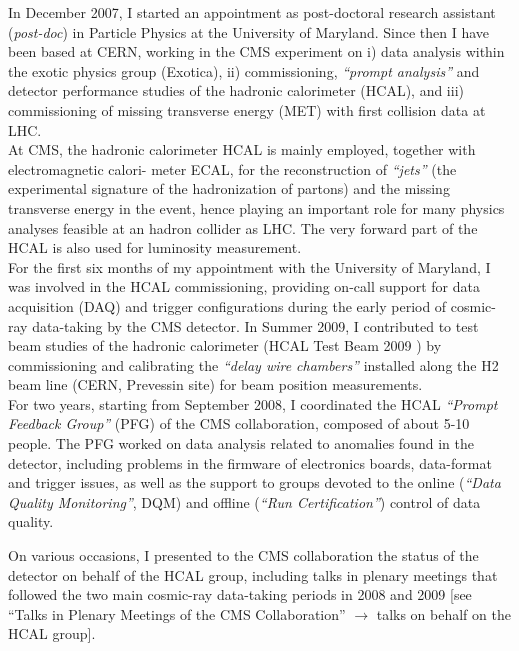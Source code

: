 \documentclass[10pt, a4paper]{article}
\begin{document}
In December 2007, I started an appointment as post-doctoral research 
assistant ({\it post-doc}) in Particle Physics at the University of Maryland. 
Since then I have been based at CERN, working in the CMS experiment on 
i) data analysis within the exotic physics group (Exotica), 
ii) commissioning, {\it ``prompt analysis''} and detector performance studies 
of the hadronic calorimeter (HCAL), and 
iii) commissioning of missing transverse energy (MET) with first collision data at LHC. \\

At CMS, the hadronic calorimeter HCAL is mainly employed, together with electromagnetic calori- meter ECAL, for the reconstruction 
of {\it ``jets''} (the experimental signature of the hadronization of partons) and the missing transverse energy
in the event, hence playing an important role for many physics analyses 
feasible at an hadron collider as LHC. The very forward part of the HCAL is also 
used for luminosity measurement. \\

For the first six months of my appointment with the University of Maryland, I was involved in the 
HCAL commissioning, providing on-call support for data acquisition (DAQ) and trigger configurations 
during the early period of cosmic-ray data-taking by the CMS detector. 
In Summer 2009, I contributed to test beam studies of the hadronic calorimeter
(HCAL Test Beam 2009 \cite{Chatrchyan:2010zz}) by commissioning and calibrating the 
{\it ``delay wire chambers''} installed along the H2 beam line (CERN, Prevessin site) 
for beam position measurements. \\

For two years, starting from September 2008, I coordinated the 
HCAL {\it ``Prompt Feedback Group''} (PFG) of the CMS collaboration, 
composed of about 5-10 people. The PFG worked 
on data analysis related to anomalies found in the detector, including 
problems in the firmware of electronics boards, data-format and trigger issues, 
as well as the support to groups devoted to the online ({\it ``Data Quality Monitoring''}, DQM)
and offline ({\it ``Run Certification''}) control of data quality.

On various occasions, I presented to the CMS collaboration the status of the detector on behalf of the HCAL group, 
including talks in plenary meetings that followed the two main cosmic-ray data-taking periods in 2008 and 2009
[see ``Talks in Plenary Meetings of the CMS Collaboration'' $\rightarrow$ talks on behalf on the HCAL group].
\end{document}
